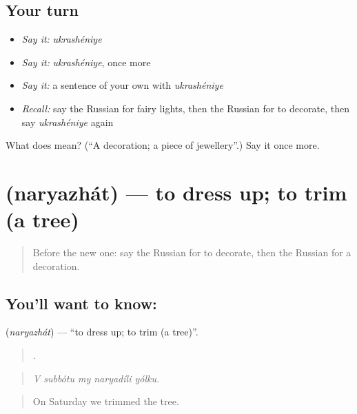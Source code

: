 \subsection*{Your turn}
\begin{itemize}
\raggedright
  \item \emph{Say it:} \emph{ukrashéniye}
  \item \emph{Say it:} \emph{ukrashéniye}, once more
  \item \emph{Say it:} a sentence of your own with \emph{ukrashéniye}
  \item \emph{Recall:} say the Russian for fairy lights, then the Russian for to decorate, then say \emph{ukrashéniye} again
\end{itemize}

\begin{tcolorbox}[breakable,colback=teal!4,colframe=teal!35!black,title={Before you move on}]
What does  mean? (\textquotedblleft{}A decoration; a piece of jewellery\textquotedblright{}.) Say it once more.
\end{tcolorbox}
\section[\texorpdfstring{\ru{наряжать} (naryazhát)}{наряжать (naryazhát)}]{ (naryazhát) — to dress up; to trim (a tree)}

\label{lesson:RU-C313-naryazhat}



\begin{quote}
Before the new one: say the Russian for to decorate, then the Russian for a decoration.
\end{quote}

\subsection*{You'll want to know: }
\textbf{} (\emph{naryazhát}) — \textquotedblleft{}to dress up; to trim (a tree)\textquotedblright{}.

\begin{quote}
    .
\end{quote}

\begin{quote}
\emph{V subbótu my naryadíli yólku.}
\end{quote}

\begin{quote}
On Saturday we trimmed the tree.
\end{quote}

